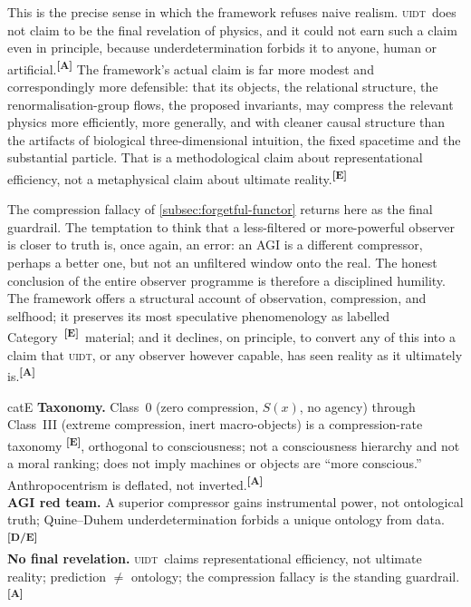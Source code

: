 \documentclass[12pt,a4paper,twoside]{article}
\theoremstyle{plain}
\theoremstyle{definition}
\theoremstyle{remark}
\newcommand{\UIDT}{\textsc{uidt}}
\newcommand{\catmark}[1]{\textsuperscript{\textsf{\textbf{[#1]}}}}
\begin{document}
This is the precise sense in which the framework refuses naive realism. \UIDT\ does not claim to be the final revelation of physics, and it could not earn such a claim even in principle, because underdetermination forbids it to anyone, human or artificial.\catmark{A} The framework's actual claim is far more modest and correspondingly more defensible: that its objects, the relational structure, the renormalisation-group flows, the proposed invariants, may compress the relevant physics more efficiently, more generally, and with cleaner causal structure than the artifacts of biological three-dimensional intuition, the fixed spacetime and the substantial particle. That is a methodological claim about representational efficiency, not a metaphysical claim about ultimate reality.\catmark{E}

The compression fallacy of \cref{subsec:forgetful-functor} returns here as the final guardrail. The temptation to think that a less-filtered or more-powerful observer is closer to truth is, once again, an error: an AGI is a different compressor, perhaps a better one, but not an unfiltered window onto the real. The honest conclusion of the entire observer programme is therefore a disciplined humility. The framework offers a structural account of observation, compression, and selfhood; it preserves its most speculative phenomenology as labelled Category~\catmark{E}\ material; and it declines, on principle, to convert any of this into a claim that \UIDT, or any observer however capable, has seen reality as it ultimately is.\catmark{A}
\newpage
\begin{evidencebox}{catE}
\textbf{Taxonomy.} Class~0 (zero compression, $S(x)$, no agency) through Class~III (extreme compression, inert macro-objects) is a compression-rate taxonomy \catmark{E}, orthogonal to consciousness; not a consciousness hierarchy and not a moral ranking; does not imply machines or objects are ``more conscious.''
Anthropocentrism is deflated, not inverted.\catmark{A}\\[0.3em]
\textbf{AGI red team.} A superior compressor gains instrumental power, not ontological truth; Quine--Duhem underdetermination forbids a unique ontology from
data.\catmark{D/E}\\[0.3em]
\textbf{No final revelation.} \UIDT\ claims representational efficiency, not ultimate reality; prediction $\neq$ ontology; the compression fallacy is the standing guardrail.\catmark{A}
\end{evidencebox}
\newpage
\end{document}
